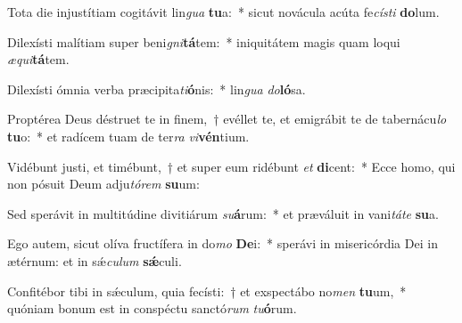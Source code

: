 \item Tota die injustítiam cogitávit lin\textit{gua} \textbf{tu}a:~* sicut novácula acúta fe\textit{cís}\textit{ti} \textbf{do}lum.
\item Dilexísti malítiam super beni\textit{gni}\textbf{tá}tem:~* iniquitátem magis quam loqui \textit{æ}\textit{qui}\textbf{tá}tem.
\item Dilexísti ómnia verba præcipita\textit{ti}\textbf{ó}nis:~* lin\textit{gua} \textit{do}\textbf{ló}sa.
\item Proptérea Deus déstruet te in finem,~† evéllet te, et emigrábit te de tabernácu\textit{lo} \textbf{tu}o:~* et radícem tuam de ter\textit{ra} \textit{vi}\textbf{vén}tium.
\item Vidébunt justi, et timébunt,~† et super eum ridébunt \textit{et} \textbf{di}cent:~* Ecce homo, qui non pósuit Deum adju\textit{tó}\textit{rem} \textbf{su}um:
\item Sed sperávit in multitúdine divitiárum \textit{su}\textbf{á}rum:~* et præváluit in vani\textit{tá}\textit{te} \textbf{su}a.
\item Ego autem, sicut olíva fructífera in do\textit{mo} \textbf{De}i:~* sperávi in misericórdia Dei in ætérnum: et in sǽ\textit{cu}\textit{lum} \textbf{sǽ}culi.
\item Confitébor tibi in sǽculum, quia fecísti:~† et exspectábo no\textit{men} \textbf{tu}um,~* quóniam bonum est in conspéctu sanctó\textit{rum} \textit{tu}\textbf{ó}rum.
